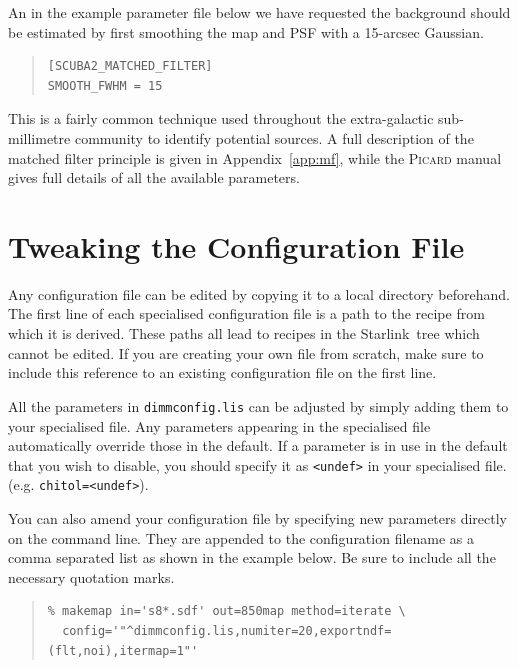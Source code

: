 \documentclass[twoside,11pt]{article}
\newcommand{\htmladdnormallink}[2]{#1}
\newcommand{\htmlref}[2]{#1}
\newcommand{\latexhtml}[2]{#1}
\newcommand{\xlabel}[1]{}
\renewcommand{\_}{\texttt{\symbol{95}}}
\newenvironment{myquote}{\begin{quote}\begin{small}}{\end{small}\end{quote}}
\newcommand{\starlink}{\htmladdnormallink{Starlink}{http://starlink.jach.hawaii.edu}}
\newcommand{\cref}[3]{\latexhtml{#1~\ref{#2}}{\htmlref{#3}{#2}}}
\begin{document}
An in the example parameter file below we have requested the
background should be estimated by first smoothing the map and PSF with
a 15-arcsec Gaussian.
\begin{myquote}
\begin{verbatim}
[SCUBA2_MATCHED_FILTER]
SMOOTH_FWHM = 15
\end{verbatim}
\end{myquote}
This is a fairly common technique used throughout the extra-galactic
sub-millimetre community to identify potential sources. A full
description of the matched filter principle is given in
\cref{Appendix}{app:mf}{SCUBA-2 Matched Filter}, while the \textsc{Picard}
manual gives full details of all the available parameters.

\clearpage
\section{\xlabel{tweak}Tweaking the Configuration File}
\label{sec:tweak}

Any configuration file can be edited by copying it to a local
directory beforehand. The first line of each specialised configuration
file is a path to the recipe from which it is derived. These paths all
lead to recipes in the \starlink\ tree which cannot be edited. If you
are creating your own file from scratch, make sure to include this
reference to an existing configuration file on the first line.

All the parameters in \texttt{dimmconfig.lis} can be adjusted by
simply adding them to your specialised file. Any parameters appearing
in the specialised file automatically override those in the default.
If a parameter is in use in the default that you wish to disable, you
should specify it as \texttt{<undef>} in your specialised file. (e.g.
\texttt{chitol=<undef>}).

You can also amend your configuration file by specifying new
parameters directly on the command line. They are appended to the
configuration filename as a comma separated list as shown in the
example below. Be sure to include all the necessary quotation marks.

\begin{myquote}
\begin{verbatim}
% makemap in='s8*.sdf' out=850map method=iterate \
  config='"^dimmconfig.lis,numiter=20,exportndf=(flt,noi),itermap=1"'
\end{verbatim}
\end{myquote}
\end{document}
